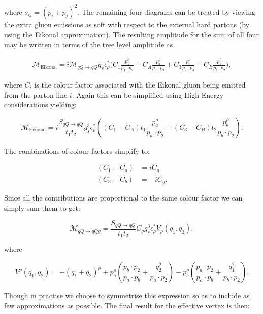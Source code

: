 		where $s_{ij} = (p_i + p_j)^2$.  The remaining four diagrams can be treated by viewing the extra gluon emissions as soft with
		respect to the external hard partons (by using the Eikonal approximation).  The resulting
		amplitude for the sum of all four may be written in terms of the tree level amplitude as

		\begin{align}
			\mathcal{M}_{\text{Eikonal}} = i\mathcal{M}_{qQ\rightarrow qQ}g_s\epsilon^*_\rho
			\Big(C_1\frac{p_1^\rho}{p_1\cdot p_2} - C_A\frac{p_a^\rho}{p_a\cdot p_2}
			+ C_3\frac{p_r^\rho}{p_2\cdot p_3} - C_B\frac{p_b^\rho}{p_b\cdot p_2}\Big),
		\end{align}

		where $C_i$ is the colour factor associated with the Eikonal gluon being emitted from the
		parton line $i$.  Again this can be simplified using High Energy considerations yielding:

		\begin{equation}
			\mathcal{M}_{\text{Eikonal}} = i\frac{S_{qQ\rightarrow qQ}}{t_1t_2}g_s^3\epsilon^*_\rho
			\left((C_1-C_A)t_1\frac{p_a^\rho}{p_a\cdot p_2} + (C_3-C_B)t_2\frac{p_b^\rho}{p_b\cdot p_2}\right).
		\end{equation}

		The combinations of colour factors simplify to:

		\begin{align}
			(C_1 - C_a) &=  iC_g \\
			(C_3 - C_b) &= -iC_g.
		\end{align}

		Since all the contributions are proportional to the same colour factor we can simply sum
		them to get:

		\begin{equation}
			\mathcal{M}_{qQ\rightarrow qQg} = \frac{S_{qQ\rightarrow qQ}}{t_1t_2}C_gg_s^3\epsilon^*_\rho V_\rho(q_1, q_2),
		\end{equation}

		where

		\begin{equation}
			V^\rho(q_1, q_2) = -(q_1 + q_2)^\rho +
			p_a^\rho\left(\frac{p_b\cdot p_2}{p_a\cdot p_b} + \frac{q^2_2}{p_a\cdot p_2}\right) -
			p_b^\rho\left(\frac{p_a\cdot p_2}{p_a\cdot p_b} + \frac{q^2_1}{p_b\cdot p_2}\right).
		\end{equation}

		Though in practise we choose to symmetrise this expression so as to include as few
		approximations as possible.  The final result for the effective vertex is then:


